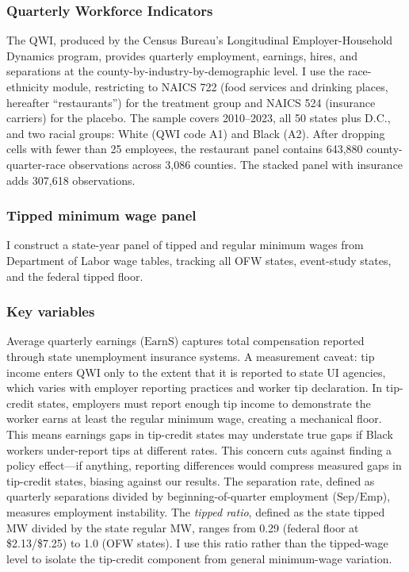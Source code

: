 \documentclass[12pt]{article}
\begin{document}
\subsubsection*{Quarterly Workforce Indicators} The QWI, produced by the Census Bureau's Longitudinal Employer-Household Dynamics program, provides quarterly employment, earnings, hires, and separations at the county-by-industry-by-demographic level. I use the race-ethnicity module, restricting to NAICS 722 (food services and drinking places, hereafter ``restaurants'') for the treatment group and NAICS 524 (insurance carriers) for the placebo. The sample covers 2010--2023, all 50 states plus D.C., and two racial groups: White (QWI code A1) and Black (A2). After dropping cells with fewer than 25 employees, the restaurant panel contains 643,880 county-quarter-race observations across 3,086 counties. The stacked panel with insurance adds 307,618 observations.

\subsubsection*{Tipped minimum wage panel} I construct a state-year panel of tipped and regular minimum wages from Department of Labor wage tables, tracking all OFW states, event-study states, and the federal tipped floor.

\subsubsection*{Key variables} Average quarterly earnings ($\text{EarnS}$) captures total compensation reported through state unemployment insurance systems. A measurement caveat: tip income enters QWI only to the extent that it is reported to state UI agencies, which varies with employer reporting practices and worker tip declaration. In tip-credit states, employers must report enough tip income to demonstrate the worker earns at least the regular minimum wage, creating a mechanical floor. This means earnings gaps in tip-credit states may understate true gaps if Black workers under-report tips at different rates. This concern cuts against finding a policy effect---if anything, reporting differences would compress measured gaps in tip-credit states, biasing against our results. The separation rate, defined as quarterly separations divided by beginning-of-quarter employment ($\text{Sep}/\text{Emp}$), measures employment instability. The \textit{tipped ratio}, defined as the state tipped MW divided by the state regular MW, ranges from 0.29 (federal floor at \$2.13/\$7.25) to 1.0 (OFW states). I use this ratio rather than the tipped-wage level to isolate the tip-credit component from general minimum-wage variation.
\end{document}
